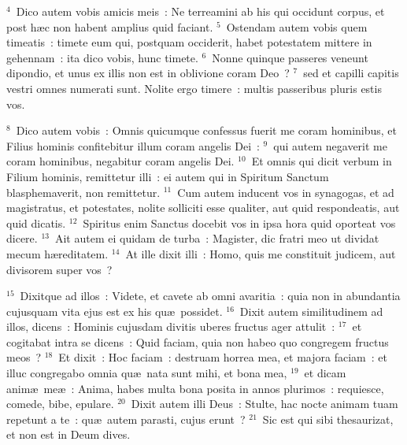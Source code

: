 ${}^{4}$~Dico autem vobis amicis meis~: Ne terreamini ab his qui occidunt corpus, et post h\ae c non habent amplius quid faciant.
${}^{5}$~Ostendam autem vobis quem timeatis~: timete eum qui, postquam occiderit, habet potestatem mittere in gehennam~: ita dico vobis, hunc timete.
${}^{6}$~Nonne quinque passeres veneunt dipondio, et unus ex illis non est in oblivione coram Deo~?
${}^{7}$~sed et capilli capitis vestri omnes numerati sunt. Nolite ergo timere~: multis passeribus pluris estis vos.


${}^{8}$~Dico autem vobis~: Omnis quicumque confessus fuerit me coram hominibus, et Filius hominis confitebitur illum coram angelis Dei~:
${}^{9}$~qui autem negaverit me coram hominibus, negabitur coram angelis Dei.
${}^{10}$~Et omnis qui dicit verbum in Filium hominis, remittetur illi~: ei autem qui in Spiritum Sanctum blasphemaverit, non remittetur.
${}^{11}$~Cum autem inducent vos in synagogas, et ad magistratus, et potestates, nolite solliciti esse qualiter, aut quid respondeatis, aut quid dicatis.
${}^{12}$~Spiritus enim Sanctus docebit vos in ipsa hora quid oporteat vos dicere.
${}^{13}$~Ait autem ei quidam de turba~: Magister, dic fratri meo ut dividat mecum h\ae reditatem.
${}^{14}$~At ille dixit illi~: Homo, quis me constituit judicem, aut divisorem super vos~?


${}^{15}$~Dixitque ad illos~: Videte, et cavete ab omni avaritia~: quia non in abundantia cujusquam vita ejus est ex his qu\ae\ possidet.
${}^{16}$~Dixit autem similitudinem ad illos, dicens~: Hominis cujusdam divitis uberes fructus ager attulit~:
${}^{17}$~et cogitabat intra se dicens~: Quid faciam, quia non habeo quo congregem fructus meos~?
${}^{18}$~Et dixit~: Hoc faciam~: destruam horrea mea, et majora faciam~: et illuc congregabo omnia qu\ae\ nata sunt mihi, et bona mea,
${}^{19}$~et dicam anim\ae\ me\ae~: Anima, habes multa bona posita in annos plurimos~: requiesce, comede, bibe, epulare.
${}^{20}$~Dixit autem illi Deus~: Stulte, hac nocte animam tuam repetunt a te~: qu\ae\ autem parasti, cujus erunt~?
${}^{21}$~Sic est qui sibi thesaurizat, et non est in Deum dives.


